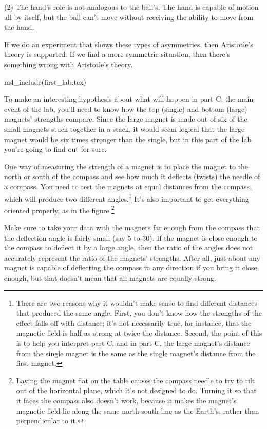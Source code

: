 (2) The hand's role is not analogous to the ball's.  The
hand is capable of motion all by itself, but the ball can't
move without receiving the ability to move from the hand.

If we do an experiment that shows these types of asymmetries,
then Aristotle's theory is supported.  If we find a more
symmetric situation, then there's something wrong with Aristotle's theory.

\observations
m4_include(first_lab.tex) 


To make an interesting hypothesis about what will happen in
part C, the main event of the lab, you'll need to know how
the top (single) and bottom (large) magnets' strengths
compare. Since the large magnet is made out of six of the small
magnets stuck together in a stack, it would seem logical that the large magnet would
be six times stronger than the single, but in this part
of the lab you're going to find out for sure.


One way of measuring the strength of a magnet is to place
the magnet to the north or south of the compass and see how
much it deflects (twists) the needle of a compass. You need
to test the magnets at equal distances from the compass,
which will produce two different angles.\footnote{There are two
reasons why it wouldn't make sense to find different distances
that produced the same angle. First, you don't know how the
strengths of the effect falls off with distance; it's not necessarily
true, for instance, that the magnetic field is half as strong at
twice the distance. Second, the point of this is to help you
interpret part C, and in part C, the large magnet's distance
from the single magnet is the same as the single magnet's distance
from the first magnet.}
It's also important to get everything oriented
properly, as in the figure.\footnote{Laying the magnet flat on the table causes
the compass needle to try to tilt out of the horizontal plane, which it's
not designed to do. Turning it so that it faces the compass also doesn't
work, because it makes the magnet's magnetic field lie along the same
north-south line as the Earth's, rather than perpendicular to it.}

Make sure
to take your data with the magnets far enough from the
compass that the deflection angle is fairly small (say 5 to
30\degunit).  If the magnet is close enough to the compass
to deflect it by a large angle, then the ratio of the angles
does not accurately represent the ratio of the magnets'
strengths. After all, just about any magnet is capable of
deflecting the compass in any direction if you bring it
close enough, but that doesn't mean that all magnets are
equally strong.



